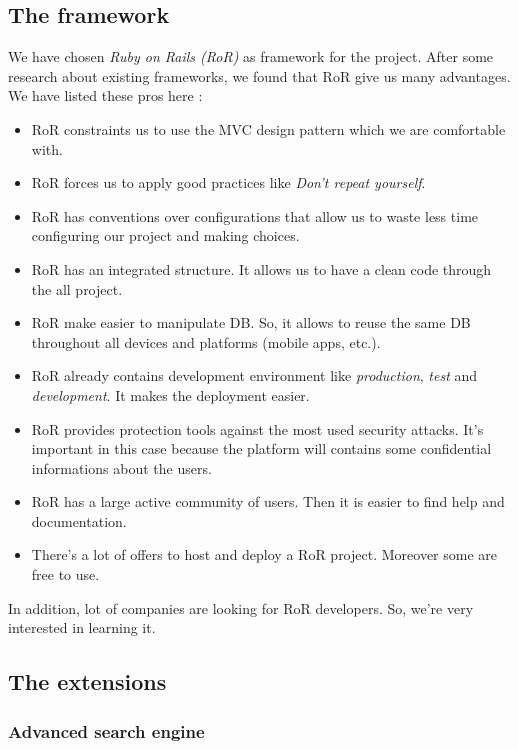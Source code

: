 \subsection{The framework}

We have chosen \emph{Ruby on Rails (RoR)} as framework for the project. After some research about existing frameworks, we found that RoR give us many advantages. We have listed these pros here :

\begin{itemize}
   \item RoR constraints us to use the MVC design pattern which we are comfortable with.
   \item RoR forces us to apply good practices like \emph{Don't repeat yourself}.
   \item RoR has conventions over configurations that allow us to waste less time configuring our project and making choices.
   \item RoR has an integrated structure. It allows us to have a clean code through the all project.
   \item RoR make easier to manipulate DB. So, it allows to reuse the same DB throughout all devices and platforms (mobile apps, etc.).
   \item RoR already contains development environment like \emph{production}, \emph{test} and \emph{development}. It makes the deployment easier.
   \item RoR provides protection tools against the most used security attacks. It's important in this case because the platform will contains some confidential informations about the users.
   \item RoR has a large active community of users. Then it is easier to find help and documentation.
   \item There's a lot of offers to host and deploy a RoR project. Moreover some are free to use.
\end{itemize}

In addition, lot of companies are looking for RoR developers. So, we're very interested in learning it.

\subsection{The extensions}

\subsubsection{Advanced search engine}

